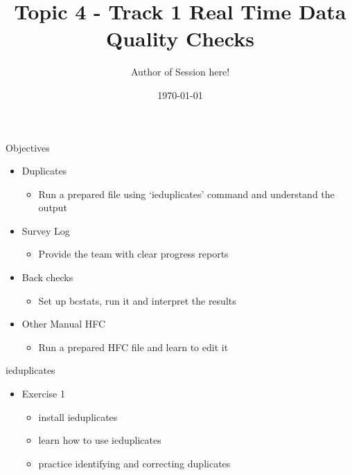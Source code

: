 \documentclass[aspectratio=169]{beamer}
\title{Topic 4 - Track 1 \newline Real Time Data Quality Checks}
\date{\today}
\author{Author of Session here!} %
\institute{Development Impact Evaluation (DIME) \newline The World Bank }
\begin{document}
	
	{
		\maketitle
	}

\begin{frame}{Objectives}
	\begin{itemize}
		\item Duplicates
			\begin{itemize}
				\item Run a prepared file using ‘ieduplicates’ command and understand the output
			\end{itemize}
		\item Survey Log
			\begin{itemize}
				\item Provide the team with clear progress reports
			\end{itemize}
		\item Back checks 
			\begin{itemize}
				\item Set up bcstats, run it and interpret the results
			\end{itemize}
		\item Other Manual HFC
			\begin{itemize}
				\item Run a prepared HFC file and learn to edit it
			\end{itemize}
	\end{itemize}
\end{frame}

\begin{frame}{ieduplicates}
\begin{itemize}
	\item Exercise 1
	\begin{itemize}
		\item install ieduplicates
		\item learn how to use ieduplicates
		\item practice identifying and correcting duplicates
	\end{itemize}
\end{itemize}
\end{frame}
\end{document}
